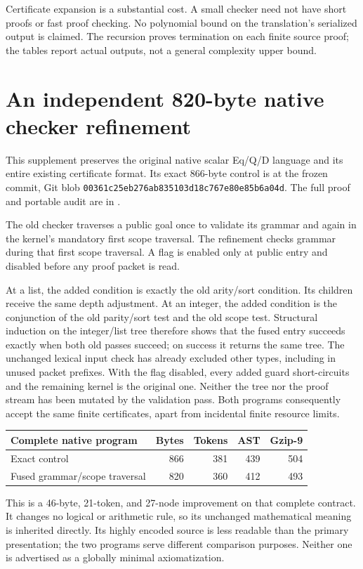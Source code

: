 \documentclass[11pt,letterpaper]{article}
\theoremstyle{definition}
\begin{document}
Certificate expansion is a substantial cost. A small checker need not
have short proofs or fast proof checking. No polynomial bound on the
translation's serialized output is claimed. The recursion proves
termination on each finite source proof; the tables report actual
outputs, not a general complexity upper bound.

\section{An independent 820-byte native checker refinement}
\label{sec:fusion}

This supplement preserves the original native scalar Eq/Q/D language
and its entire existing certificate format. Its exact 866-byte control
is  at the frozen
commit, Git blob \texttt{00361c25eb276ab835103d18c767e80e85b6a04d}.
The full proof and portable audit are in .

The old checker traverses a public goal once to validate its grammar and
again in the kernel's mandatory first scope traversal. The refinement
checks grammar during that first scope traversal. A flag is enabled only
at public entry and disabled before any proof packet is read.

At a list, the added condition is exactly the old arity/sort condition.
Its children receive the same depth adjustment. At an integer, the
added condition is the conjunction of the old parity/sort test and the
old scope test. Structural induction on the integer/list tree therefore
shows that the fused entry succeeds exactly when both old passes succeed;
on success it returns the same tree. The unchanged lexical input check
has already excluded other types, including in unused packet prefixes.
With the flag disabled, every added guard short-circuits and the remaining
kernel is the original one. Neither the tree nor the proof stream has
been mutated by the validation pass. Both programs consequently accept
the same finite certificates, apart from incidental finite resource
limits.

\begin{center}
\begin{tabular}{lrrrr}
\toprule
Complete native program & Bytes & Tokens & AST & Gzip-9\\
\midrule
Exact control & 866 & 381 & 439 & 504\\
Fused grammar/scope traversal & 820 & 360 & 412 & 493\\
\bottomrule
\end{tabular}
\end{center}
This is a 46-byte, 21-token, and 27-node improvement on that complete
contract. It changes no logical or arithmetic rule, so its unchanged
mathematical meaning is inherited directly. Its highly encoded source
is less readable than the primary presentation; the two programs serve
different comparison purposes. Neither one is advertised as a globally
minimal axiomatization.
\end{document}
